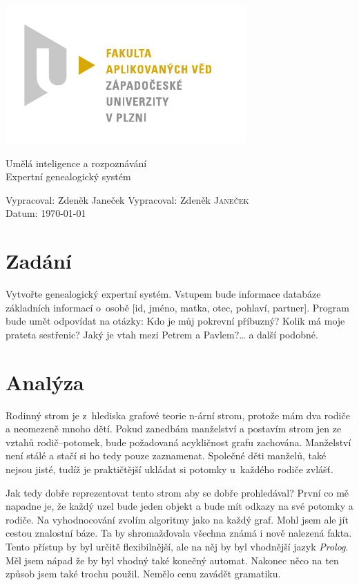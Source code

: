 \documentclass[a4paper, 12pt]{article}
\begin{document}
\begin{titlepage}
\includegraphics{fav_cmyk.pdf}
\vfill
\begin{center}
{\huge Umělá inteligence a rozpoznávání}\\[3ex]
{\Large Expertní genealogický systém}
\end{center}
\vfill
\begin{tabbing}
Vypracoval: \hspace{1ex}\=Zdeněk Janeček\kill
Vypracoval: \>Zdeněk \textsc{Janeček}\\[1ex]
Datum:\> \today
\end{tabbing}
\end{titlepage}

\section{Zadání}
Vytvořte genealogický expertní systém. Vstupem bude informace databáze
základních informací o~osobě [id, jméno, matka, otec, pohlaví, partner].
Program bude umět odpovídat na otázky: Kdo je můj pokrevní příbuzný?
Kolik má moje prateta sestřenic? Jaký je vtah mezi Petrem a Pavlem?\ldots
a další podobné.

\section{Analýza}
Rodinný strom je z~hlediska grafové teorie n-ární strom, protože mám dva
rodiče a neomezeně mnoho dětí. Pokud zanedbám manželství a postavím
strom jen ze vztahů rodič--potomek, bude požadovaná acykličnost grafu
zachována.
Manželství není stálé a stačí si ho tedy pouze zaznamenat.
Společné děti manželů, také nejsou jisté, tudíž je praktičtější ukládat
si potomky u~každého rodiče zvlášť.

Jak tedy dobře reprezentovat tento strom aby se dobře prohledával?
První co mě napadne je, že každý uzel bude jeden objekt a bude mít
odkazy na své potomky a rodiče. Na vyhodnocování zvolím algoritmy
jako na každý graf. Mohl jsem ale jít cestou znalostní báze. Ta by
shromažďovala všechna známá i nově nalezená fakta. Tento přístup
by byl určitě flexibilnější, ale na něj by byl vhodnější jazyk \emph{Prolog}.
Měl jsem nápad že by byl vhodný také konečný automat. Nakonec něco
na ten způsob jsem také trochu použil. Nemělo cenu zavádět gramatiku.
\end{document}
